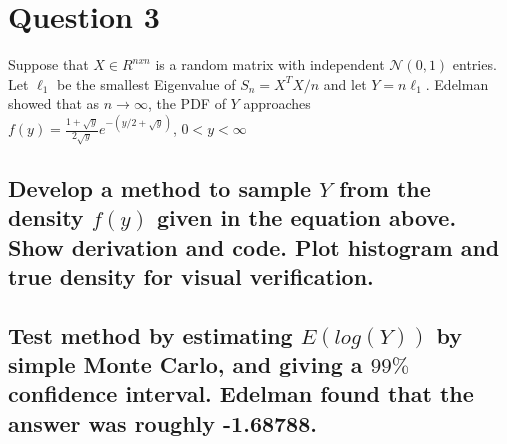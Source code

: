 \documentclass[20pt]{article} %
\begin{document}
\section{Question 3}
Suppose that $X \in \!R^{nxn}$ is a random matrix with independent $\mathcal{N}(0,1)$ entries. Let $\ell_1$ be the smallest Eigenvalue of $S_n = X^{T}X/n$ and let $Y = n\ell_1$.  Edelman showed that as $n \rightarrow \infty$, the PDF of $Y$ approaches \\ 
{\Large $f(y) = \frac{1+\sqrt{y}}{2\sqrt{y}}e^{-(y/2 + \sqrt{y})}$, $0<y<\infty$ } 
\subsection{Develop a method to sample $Y$ from the density $f(y)$ given in the equation above. Show derivation and code. Plot histogram and true density for visual verification.}

\subsection{Test method by estimating $\!E(log(Y))$ by simple Monte Carlo, and giving a $99\%$ confidence interval. Edelman found that the answer was roughly -1.68788.}
\end{document}
